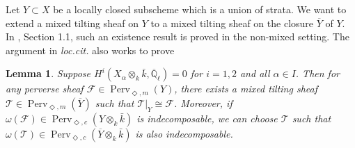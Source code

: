 \documentclass{amsart}
\theoremstyle{plain}
\newtheorem{lemma}[subsubsection]{Lemma}
\theoremstyle{definition}
\theoremstyle{remark}
\numberwithin{equation}{subsection}
\begin{document}
Let $Y\subset X$ be a locally closed subscheme which is a union of strata. We want to extend a mixed tilting sheaf on $Y$ to a mixed tilting sheaf on the closure $\overline{Y}$ of $Y$. In \cite{BBM}, Section 1.1, such an existence result is proved in the non-mixed setting. The argument in \textit{loc.cit.} also works to prove

\begin{lemma}\label{l:exist}
Suppose $H^i({{X_\alpha}\otimes_k\bar{k}},{\overline{\mathbb{Q}}_{\ell}})=0$ for $i=1,2$ and all $\alpha\in I$. Then for any perverse sheaf ${\mathcal{F}}\in {\operatorname{Perv}_{\Diamond,m}({Y})}$, there exists a mixed tilting sheaf ${\mathcal{T}}\in {\operatorname{Perv}_{\Diamond,m}({\overline{Y}})}$ such that ${\mathcal{T}}|_Y\cong{\mathcal{F}}$. Moreover, if $\omega({\mathcal{F}})\in {\operatorname{Perv}_{\Diamond,c}({{{Y}}\otimes_k\bar{k}})}$ is indecomposable, we can choose ${\mathcal{T}}$ such that $\omega({\mathcal{T}})\in{\operatorname{Perv}_{\Diamond,c}({{{\overline{Y}}}\otimes_k\bar{k}})}$ is also indecomposable.
\end{lemma}
\end{document}
